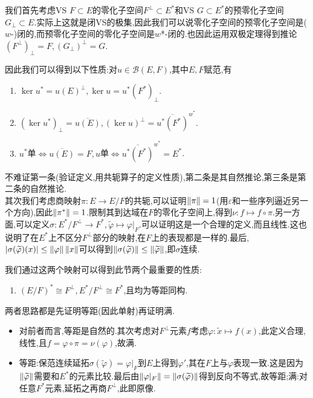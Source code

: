 \documentclass{article}
\newcommand{\mcBfunc}[1]{\mathcal{B}(#1)}
\begin{document}
我们首先考虑VS $F\subset E$的零化子空间$F^\perp\subset E^{*}$和VS $G\subset E^*$的预零化子空间$G_\perp\subset E$.实际上这就是闭VS的极集,因此我们可以说零化子空间的预零化子空间是($w$-)闭的,而预零化子空间的零化子空间是$w$*-闭的.也因此运用双极定理得到推论$(F^\perp)_\perp=F, (G_\perp)^\perp=G$.

因此我们可以得到以下性质:对$u\in \mcBfunc{E,F}$,其中$E,F$赋范,有\begin{enumerate}[resume]
    \item $\ker u^*=u(E)^\perp, \ker u=u^*(F^*)_\perp$.
    \item $(\ker u^*)_\perp=\overline{u(E)}, (\ker u)^\perp=\overline{u^*(F^*)}^{w^*}$.
    \item $u^*$单$\iff \overline{u(E)}=F, u$单$\iff \overline{u^*(F^*)}^{w^*}=E^*$.
\end{enumerate}
不难证第一条(验证定义,用共轭算子的定义性质),第二条是其自然推论,第三条是第二条的自然推论.\\[3pt]

其次我们考虑商映射$\pi:E\to E/F$的共轭,可以证明$\left\|\pi\right\|=1$(用$\varepsilon$和一些序列逼近另一个方向),因此$\left\|\pi^*\right\|=1$.限制其到达域在$F$的零化子空间上,得到$\nu:f\mapsto f\circ\pi$.另一方面,可以定义$\sigma:E^*/F^\perp\to F^*, \widetilde{\varphi}\mapsto \varphi|_F$.可以证明这是一个合理的定义,而且线性.这也说明了在$E^*$上不区分$F^\perp$部分的映射,在$F$上的表现都是一样的.最后,$\left|\sigma(\widetilde{\varphi})(x)\right|\leq \left\|\varphi\right\|\left\|x\right\|$可以得到$\left\|\sigma(\widetilde{\varphi})\right\|\leq \left\|\widetilde{\varphi}\right\|$,即$\sigma$连续.

我们通过这两个映射可以得到此节两个最重要的性质:
\begin{enumerate}[resume]
    \item $(E/F)^*\cong F^\perp, E^*/F^\perp\cong F^*$,且均为等距同构.
\end{enumerate}
两者思路都是先证明等距(因此单射)再证明满.\begin{itemize}
    \item 对前者而言,等距是自然的.其次考虑对$F^\perp$元素$f$考虑$\varphi:\widetilde{x}\mapsto f(x)$,此定义合理,线性,且$f=\varphi\circ\pi=\nu(\varphi)$,故满.
    \item 等距:保范连续延拓$\sigma(\widetilde{\varphi})=\varphi|_F$到$E$上得到$\varphi'$,其在$F$上与$\varphi$表现一致.这是因为$\left\|\widetilde{\varphi}\right\|$需要和$E^*$的元素比较.最后由$\left\|\varphi|_F\right\|=\left\|\sigma(\widetilde{\varphi})\right\|$得到反向不等式,故等距;满:对任意$F^*$元素,延拓之再商$F^\perp$,此即原像.
\end{itemize}
\end{document}

